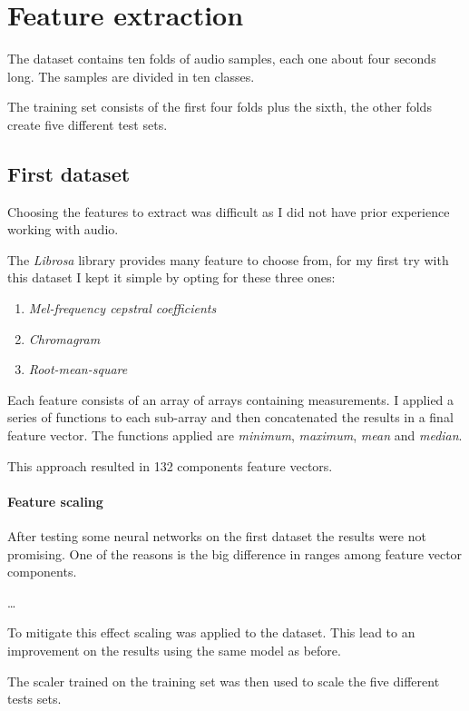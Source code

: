 \section{Feature extraction}

The dataset contains ten folds of audio samples, each one about 
four seconds long. The samples are divided in ten classes.

The training set consists of the first four folds plus the sixth, 
the other folds create five different test sets.

\subsection{First dataset}
Choosing the features to extract was difficult as I did not have 
prior experience working with audio. 

The \emph{Librosa} library provides many feature to choose from, 
for my first try with this dataset I kept it simple 
by opting for these three ones: 
\begin{enumerate}
    \item \emph{Mel-frequency cepstral coefficients}
    \item \emph{Chromagram}
    \item \emph{Root-mean-square}
\end{enumerate}
Each feature consists of an array of arrays containing measurements. 
I applied a series of functions to each sub-array and then concatenated 
the results in a final feature vector. 
The functions applied are \emph{minimum}, \emph{maximum}, \emph{mean} and \emph{median}.

This approach resulted in 132 components feature vectors.

\paragraph{Feature scaling}
After testing some neural networks on the first dataset the results 
were not promising. One of the reasons is the big difference in 
ranges among feature vector components.

\dots

To mitigate this effect scaling was applied to the dataset.
This lead to an improvement on the results using the same 
model as before. 

The scaler trained on the training set was then 
used to scale the five different tests sets.


